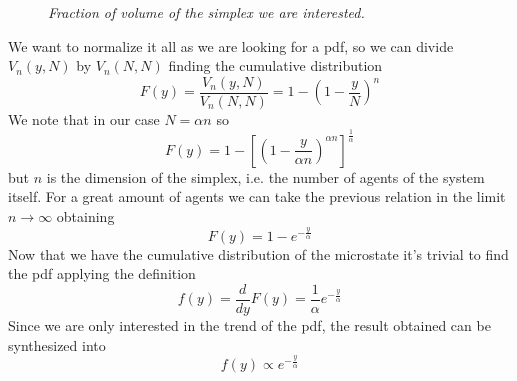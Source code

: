 \begin{figure}[ht!]
    \centering
    \caption{\emph{Fraction of volume of the simplex we are interested.}}
    \label{fig:simplexVolume}
\end{figure}
We want to normalize it all as we are looking for a pdf, so we can divide $V_n\left(y, N\right)$ by $V_n\left(N, N\right)$ finding the cumulative distribution
\begin{equation}
    F(y) = \frac{V_n\left(y, N\right)}{V_n\left(N, N\right)} = 1 - \left(1 - \frac{y}{N}\right)^n
\end{equation}
We note that in our case $N=\alpha n$ so
\begin{equation*}
    F(y) =  1 - \left[\left(1 - \frac{y}{\alpha n}\right)^{\alpha n}\right]^\frac{1}{\alpha}
\end{equation*}
but $n$ is the dimension of the simplex, i.e. the number of agents of the system itself.
For a great amount of agents we can take the previous relation in the limit $n\to\infty$ obtaining
\begin{equation}
    F(y) = 1 - e^{-\frac{y}{\alpha}}
\end{equation}
Now that we have the cumulative distribution of the microstate it's trivial to find the pdf applying the definition
\begin{equation*}
    f(y) = \frac{d}{dy}F(y) = \frac{1}{\alpha} e^{-\frac{y}{\alpha}}
\end{equation*}
Since we are only interested in the trend of the pdf, the result obtained can be synthesized into
\begin{equation}
    f(y) \propto e^{-\frac{y}{\alpha}}
\end{equation}